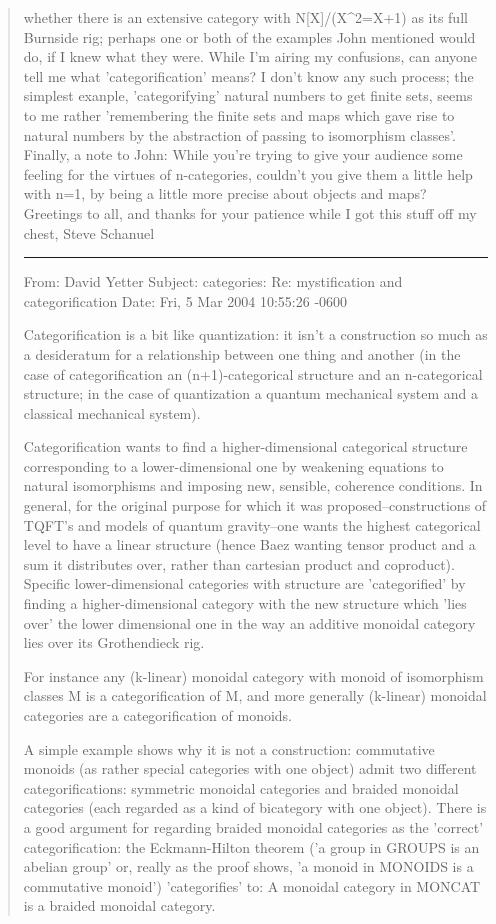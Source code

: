 \begin{quote}
whether there is an extensive category with N[X]/(X^2=X+1) as its full
Burnside rig; perhaps one or both of the examples John mentioned would
do, if I knew what they were.
    While I'm airing my confusions, can anyone tell me what
'categorification' means? I don't know any such process; the simplest
exanple, 'categorifying' natural numbers to get finite sets, seems to me
rather 'remembering the finite sets and maps which gave rise to natural
numbers by the abstraction of passing to isomorphism classes'.
   Finally, a note to John: While you're trying to give your audience
some feeling for the virtues of n-categories, couldn't you give them a
little help with n=1, by being a little more precise about objects and
maps?
   Greetings to all, and thanks for your patience while I got this stuff
off my chest,
   Steve Schanuel


\par\noindent\rule{\textwidth}{0.4pt}


From: 	 David Yetter 
Subject: categories: Re: mystification and categorification
Date: 	 Fri, 5 Mar 2004 10:55:26 -0600	

Categorification is a bit like quantization:  it isn't a construction so much
as a desideratum for a relationship between one thing and another (in the
case of categorification an (n+1)-categorical structure and an n-categorical
structure; in the case of quantization a quantum mechanical system and
a classical mechanical system).

Categorification wants to find a higher-dimensional categorical structure
corresponding to a lower-dimensional one by weakening equations to
natural isomorphisms and imposing new, sensible, coherence conditions.
In general, for the original purpose for which it was proposed--constructions
of TQFT's and models of quantum gravity--one wants the highest categorical
level to have a linear structure (hence Baez wanting tensor product
and a sum it distributes over, rather than cartesian product and coproduct).
Specific lower-dimensional categories with structure are 'categorified' by
finding a higher-dimensional category with the new structure which 'lies over'
the lower dimensional one in the way an additive monoidal category lies
over its Grothendieck rig.

For instance any (k-linear) monoidal category with monoid of isomorphism
classes M is a categorification of M, and more generally (k-linear) monoidal
categories are a categorification of monoids.

A simple example shows why it is not a construction:  commutative monoids
(as rather special categories with one object) admit two different
categorifications:  symmetric monoidal categories and braided monoidal
categories (each regarded as a kind of bicategory with one object).
There is a good argument for regarding braided monoidal categories
as the 'correct' categorification:  the Eckmann-Hilton theorem ('a group
in GROUPS is an abelian group'  or, really as the proof shows, 'a monoid
in MONOIDS is a commutative monoid') 'categorifies' to: A monoidal category
in MONCAT is a braided monoidal category.



\end{quote}
